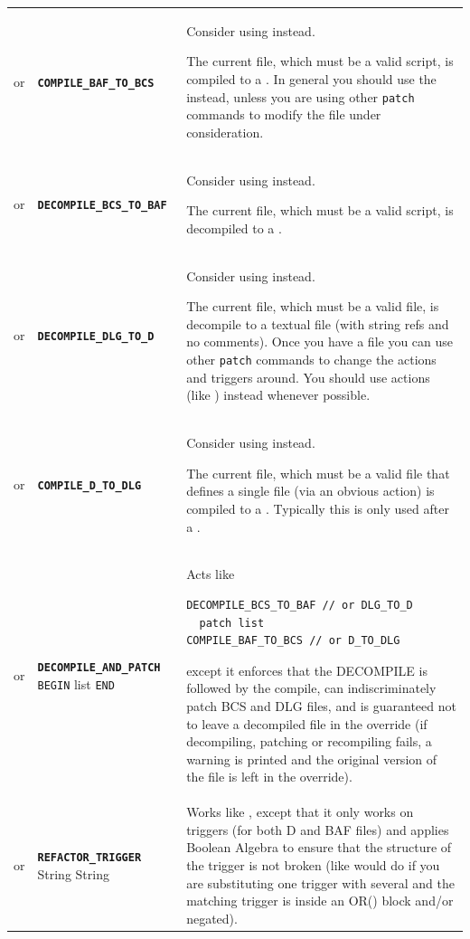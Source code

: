 \documentclass{article}
\def\ttref#1{\ahrefloc{#1}{\tt #1}}
\def\DEFINE#1{{\tt \bf #1}\label{#1}\index{#1}}
\def\t#1{{\tt #1}}
\def\Slist{{\color{red} list }}
\begin{document}
\begin{tabular}{cp{10in}|p{10in}}
or & \DEFINE{COMPILE_BAF_TO_BCS} &
Consider using \ttref{DECOMPILE_AND_PATCH} instead.

  The current file, which must be a valid \ttref{BAF} script, is compiled
  to a \ttref{BCS}. In general you should use the \ttref{COMPILE}
  \ttref{TP2 Action} instead, unless you are using other \t{patch} commands
  to modify the file under consideration. \\
or & \DEFINE{DECOMPILE_BCS_TO_BAF} &
Consider using \ttref{DECOMPILE_AND_PATCH} instead.

  The current file, which must be a valid \ttref{BCS} script, is decompiled
  to a \ttref{BAF}. \\
or & \DEFINE{DECOMPILE_DLG_TO_D} &
Consider using \ttref{DECOMPILE_AND_PATCH} instead.

  The current file, which must be a valid \ttref{DLG} file, is decompile
  to a textual \ttref{D} file (with string refs and no comments). Once you
  have a \ttref{D} file you can use other \t{patch} commands to change the
  actions and triggers around. You should use \ttref{D} actions (like
  \ttref{REPLACE_ACTION_TEXT}) instead whenever possible.  \\
or & \DEFINE{COMPILE_D_TO_DLG} &
Consider using \ttref{DECOMPILE_AND_PATCH} instead.

  The current file, which must be a valid \ttref{D} file that defines
  a single \ttref{DLG} file (via an obvious \ttref{BEGIN} action) is
  compiled to a \ttref{DLG}. Typically this is only used after a
  \ttref{DECOMPILE_DLG_TO_D}.  \\
or & \DEFINE{DECOMPILE_AND_PATCH} \t{BEGIN} \ttref{patch} \Slist
  \t{END} &
  Acts like
\begin{verbatim}
DECOMPILE_BCS_TO_BAF // or DLG_TO_D
  patch list
COMPILE_BAF_TO_BCS // or D_TO_DLG
\end{verbatim}
  except it enforces that the DECOMPILE is followed by the compile,
  can indiscriminately patch BCS and DLG files, and is guaranteed not to leave
  a decompiled file in the override (if decompiling, patching or recompiling
  fails, a warning is printed and the original version of the file is left in
  the override).
\\
or & \DEFINE{REFACTOR_TRIGGER} \ttref{optcase} \ttref{optexact} String String &
  Works like \ttref{REPLACE_TEXTUALLY}, except that it only works on triggers
  (for both D and BAF files)
  and applies Boolean Algebra to ensure that the structure of the trigger is not
  broken (like \ttref{REPLACE_TEXTUALLY} would do if you are substituting one trigger with
  several and the matching trigger is inside an OR() block and/or negated).


\end{tabular}
\end{document}

